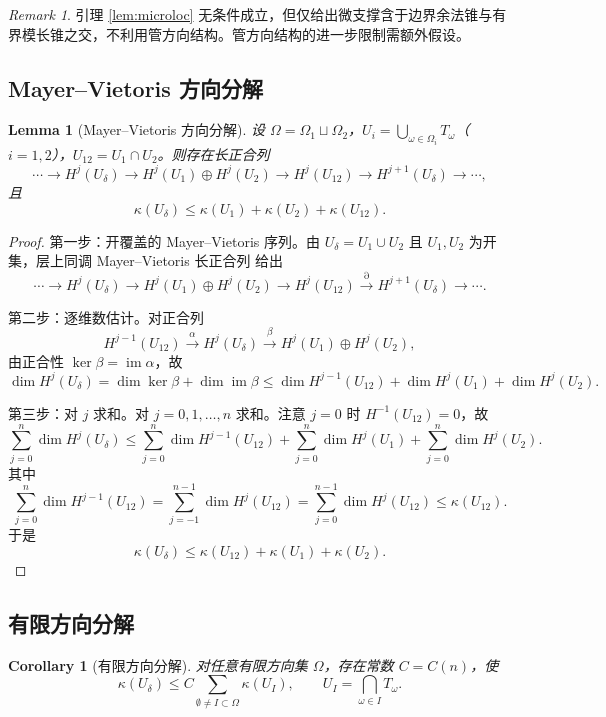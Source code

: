 \documentclass[11pt,a4paper]{article}
\newtheorem{lemma}[theorem]{Lemma}
\newtheorem{corollary}[theorem]{Corollary}
\theoremstyle{remark}
\newtheorem{remark}[theorem]{Remark}
\begin{document}
	\begin{remark}
		引理 \ref{lem:microloc} 无条件成立，但仅给出微支撑含于边界余法锥与有界模长锥之交，不利用管方向结构。管方向结构的进一步限制需额外假设。
	\end{remark}
	
	\subsection{Mayer--Vietoris 方向分解}
	\begin{lemma}[Mayer--Vietoris 方向分解]
		设 $\Omega=\Omega_1\sqcup\Omega_2$，$U_i=\bigcup_{\omega\in\Omega_i}T_\omega$（$i=1,2$），$U_{12}=U_1\cap U_2$。则存在长正合列
		\[
		\cdots\to H^j(U_\delta)\to H^j(U_1)\oplus H^j(U_2)\to H^j(U_{12})\to H^{j+1}(U_\delta)\to\cdots,
		\]
		且
		\[
		\kappa(U_\delta)\le\kappa(U_1)+\kappa(U_2)+\kappa(U_{12}).
		\]
	\end{lemma}
	
	\begin{proof}
		第一步：开覆盖的 Mayer--Vietoris 序列。由 $U_\delta=U_1\cup U_2$ 且 $U_1,U_2$ 为开集，层上同调 Mayer--Vietoris 长正合列 \cite{Iversen} 给出
		\[
		\cdots\to H^j(U_\delta)\to H^j(U_1)\oplus H^j(U_2)\to H^j(U_{12})\xrightarrow{\partial}H^{j+1}(U_\delta)\to\cdots.
		\]
		
		第二步：逐维数估计。对正合列
		\[
		H^{j-1}(U_{12})\xrightarrow{\alpha}H^j(U_\delta)\xrightarrow{\beta}H^j(U_1)\oplus H^j(U_2),
		\]
		由正合性 $\ker\beta=\operatorname{im}\alpha$，故
		\[
		\dim H^j(U_\delta)
		=\dim\ker\beta+\dim\operatorname{im}\beta
		\le\dim H^{j-1}(U_{12})+\dim H^j(U_1)+\dim H^j(U_2).
		\]
		
		第三步：对 $j$ 求和。对 $j=0,1,\ldots,n$ 求和。注意 $j=0$ 时 $H^{-1}(U_{12})=0$，故
		\[
		\sum_{j=0}^n\dim H^j(U_\delta)
		\le\sum_{j=0}^n\dim H^{j-1}(U_{12})
		+\sum_{j=0}^n\dim H^j(U_1)
		+\sum_{j=0}^n\dim H^j(U_2).
		\]
		其中
		\[
		\sum_{j=0}^n\dim H^{j-1}(U_{12})
		=\sum_{j=-1}^{n-1}\dim H^j(U_{12})
		=\sum_{j=0}^{n-1}\dim H^j(U_{12})
		\le\kappa(U_{12}).
		\]
		于是
		\[
		\kappa(U_\delta)\le\kappa(U_{12})+\kappa(U_1)+\kappa(U_2).
		\]
	\end{proof}
	
	\subsection{有限方向分解}
	\begin{corollary}[有限方向分解]
		对任意有限方向集 $\Omega$，存在常数 $C=C(n)$，使
		\[
		\kappa(U_\delta)\le C\sum_{\emptyset\neq I\subset\Omega}\kappa(U_I),\qquad U_I=\bigcap_{\omega\in I}T_\omega.
		\]
	\end{corollary}
	
\end{document}
